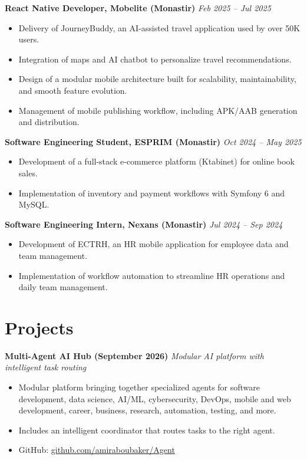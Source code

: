 \documentclass[10pt,a4paper]{article}
\begin{document}
\textbf{React Native Developer, Mobelite (Monastir)} \hfill \textit{Feb 2025 -- Jul 2025}
\begin{itemize}
  \item Delivery of JourneyBuddy, an AI-assisted travel application used by over 50K users.
  \item Integration of maps and AI chatbot to personalize travel recommendations.
  \item Design of a modular mobile architecture built for scalability, maintainability, and smooth feature evolution.
  \item Management of mobile publishing workflow, including APK/AAB generation and distribution.
\end{itemize}

\textbf{Software Engineering Student, ESPRIM (Monastir)} \hfill \textit{Oct 2024 -- May 2025}
\begin{itemize}
  \item Development of a full-stack e-commerce platform (Ktabinet) for online book sales.
  \item Implementation of inventory and payment workflows with Symfony 6 and MySQL.
\end{itemize}

\textbf{Software Engineering Intern, Nexans (Monastir)} \hfill \textit{Jul 2024 -- Sep 2024}
\begin{itemize}
  \item Development of ECTRH, an HR mobile application for employee data and team management.
  \item Implementation of workflow automation to streamline HR operations and daily team management.
\end{itemize}

\section{Projects}

\textbf{Multi-Agent AI Hub (September 2026)} \hfill \textit{Modular AI platform with intelligent task routing}
\begin{itemize}
  \item Modular platform bringing together specialized agents for software development, data science, AI/ML, cybersecurity, DevOps, mobile and web development, career, business, research, automation, testing, and more.
  \item Includes an intelligent coordinator that routes tasks to the right agent.
  \item GitHub: \href{https://github.com/amiraboubaker/Agent}{github.com/amiraboubaker/Agent}
\end{itemize}
\end{document}
